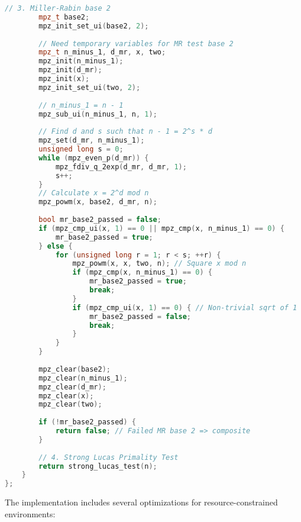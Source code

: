 \begin{lstlisting}[language=C++, caption=Baillie-PSW Test Implementation]
        // 3. Miller-Rabin base 2
        mpz_t base2;
        mpz_init_set_ui(base2, 2);
        
        // Need temporary variables for MR test base 2
        mpz_t n_minus_1, d_mr, x, two;
        mpz_init(n_minus_1);
        mpz_init(d_mr);
        mpz_init(x);
        mpz_init_set_ui(two, 2);
        
        // n_minus_1 = n - 1
        mpz_sub_ui(n_minus_1, n, 1);
        
        // Find d and s such that n - 1 = 2^s * d
        mpz_set(d_mr, n_minus_1);
        unsigned long s = 0;
        while (mpz_even_p(d_mr)) {
            mpz_fdiv_q_2exp(d_mr, d_mr, 1);
            s++;
        }
        // Calculate x = 2^d mod n
        mpz_powm(x, base2, d_mr, n);
        
        bool mr_base2_passed = false;
        if (mpz_cmp_ui(x, 1) == 0 || mpz_cmp(x, n_minus_1) == 0) {
            mr_base2_passed = true;
        } else {
            for (unsigned long r = 1; r < s; ++r) {
                mpz_powm(x, x, two, n); // Square x mod n
                if (mpz_cmp(x, n_minus_1) == 0) {
                    mr_base2_passed = true;
                    break;
                }
                if (mpz_cmp_ui(x, 1) == 0) { // Non-trivial sqrt of 1
                    mr_base2_passed = false;
                    break;
                }
            }
        }
        
        mpz_clear(base2);
        mpz_clear(n_minus_1);
        mpz_clear(d_mr);
        mpz_clear(x);
        mpz_clear(two);
        
        if (!mr_base2_passed) {
            return false; // Failed MR base 2 => composite
        }
        
        // 4. Strong Lucas Primality Test
        return strong_lucas_test(n);
    }
};
\end{lstlisting}

The implementation includes several optimizations for resource-constrained environments:

